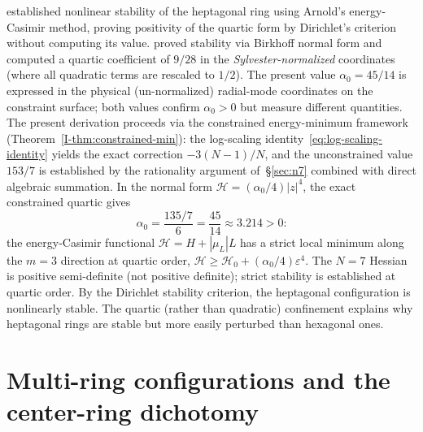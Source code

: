 \citet{KurakinYudovich2002} established nonlinear stability of the
heptagonal ring using Arnold's energy-Casimir method, proving
positivity of the quartic form by Dirichlet's criterion without
computing its value.  \citet{Schmidt2004} proved stability via Birkhoff
normal form and computed a quartic coefficient of $9/28$ in
the \emph{Sylvester-normalized} coordinates (where all quadratic
terms are rescaled to $1/2$).  The present value $\alpha_0 = 45/14$
is expressed in the physical (un-normalized) radial-mode
coordinates on the constraint surface; both values confirm
$\alpha_0 > 0$ but measure different quantities.
The present derivation proceeds via the constrained energy-minimum
framework (Theorem~\ref*{I-thm:constrained-min}): the log-scaling
identity~\eqref{eq:log-scaling-identity} yields the exact
correction $-3(N{-}1)/N$, and the unconstrained value $153/7$ is
established by the rationality argument of~\S\ref{sec:n7} combined with direct
algebraic summation.  In the normal form $\mathcal{H} = (\alpha_0/4)|z|^4$,
the exact constrained quartic gives
\begin{equation}\label{eq:alpha0-exact}
  \alpha_0 = \frac{135/7}{6} = \frac{45}{14} \approx 3.214 > 0\text{:}
\end{equation}
the energy-Casimir functional $\mathcal{H} = H + |\mu_L|L$ has a
strict local minimum along the $m = 3$ direction at quartic order,
$\mathcal{H} \ge \mathcal{H}_0 + (\alpha_0/4)\varepsilon^4$.
The $N = 7$ Hessian is positive semi-definite (not positive definite); strict stability is established at quartic order.
By the
Dirichlet stability criterion, the heptagonal
configuration is nonlinearly stable.  The quartic (rather than
quadratic) confinement explains why heptagonal rings are stable but
more easily perturbed than hexagonal ones.


\section{Multi-ring configurations and the center-ring dichotomy}
\label{sec:multiring}

